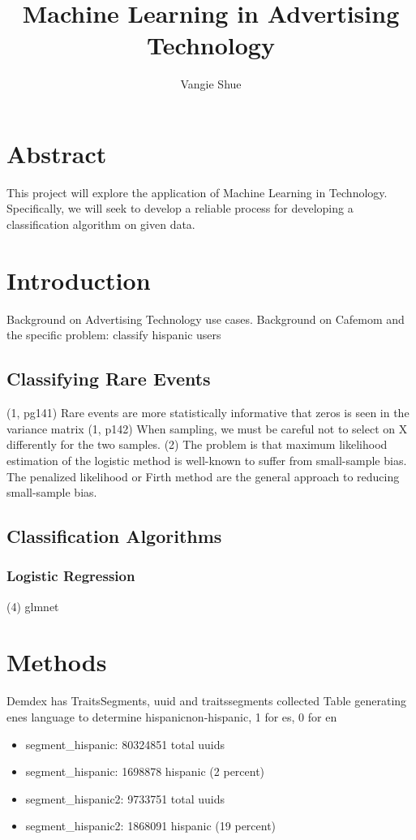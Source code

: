 \documentclass[a4paper]{article}
\title{Machine Learning in Advertising Technology}
\author{Vangie Shue}
\begin{document}


\maketitle
\section*{Abstract}
This project will explore the application of Machine Learning in Technology. Specifically, we will seek to develop a reliable process for developing a classification algorithm on given data.

\begin{multicols}{2}

\section*{Introduction}
Background on Advertising Technology use cases.
Background on Cafemom and the specific problem: classify hispanic users

\subsection*{Classifying Rare Events}
(1, pg141) Rare events are more statistically informative that zeros is seen in the variance matrix
(1, p142) When sampling, we must be careful not to select on X differently for the two samples.
(2) The problem is that maximum likelihood estimation of the logistic method is well-known to suffer from small-sample bias. The penalized likelihood or Firth method are the general approach to reducing small-sample bias.

\subsection*{Classification Algorithms}
\subsubsection*{Logistic Regression}
(4) glmnet

\section*{Methods}
Demdex has Traits\/Segments, uuid and traits\/segments collected
Table generating en\/es language to determine hispanic\/non-hispanic, 1 for es, 0 for en
\begin{itemize}
  \item segment\_hispanic: 80324851 total uuids
  \item segment\_hispanic: 1698878 hispanic (2 percent)
  \item segment\_hispanic2: 9733751 total uuids
  \item segment\_hispanic2: 1868091 hispanic (19 percent)
\end{itemize}


\end{multicols}
\end{document}
